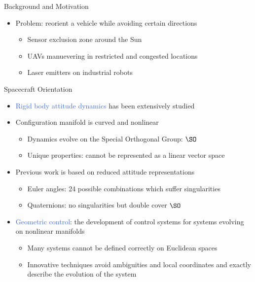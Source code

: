 \documentclass[final, usenames, dvipsnames]{beamer}
\newlength{\onecolwidth}
\def\Emph{\textcolor{RoyalBlue}}
\begin{document}
\begin{frame}[t]
\begin{columns}[T,onlytextwidth]
\begin{column}{\onecolwidth}
\begin{block}{Background and Motivation}
	\begin{itemize}
		\item Problem: reorient a vehicle while avoiding certain directions
		\begin{itemize}
			\item Sensor exclusion zone around the Sun
			\item UAVs manuevering in restricted and congested locations
			\item Laser emitters on industrial robots
		\end{itemize}
	\end{itemize}
\end{block} %

\begin{block}{Spacecraft Orientation}
	\begin{itemize}
		\item \Emph{Rigid body attitude dynamics} has been extensively studied
		\item Configuration manifold is curved and nonlinear
			\begin{itemize}
				\item Dynamics evolve on the Special Orthogonal Group: \( \SO \)
				\item Unique properties: cannot be represented as a linear vector space
			\end{itemize}
		\item Previous work is based on reduced attitude representations
			\begin{itemize}
				\item Euler angles: 24 possible combinations which suffer singularities
				\item Quaternions: no singularities but double cover \( \SO \)
			\end{itemize}
		\item \Emph{Geometric control}: the development of control systems for systems evolving on nonlinear manifolds
			\begin{itemize}
				\item Many systems cannot be defined correctly on Euclidean spaces
				\item Innovative techniques avoid ambiguities and local coordinates and exactly describe the evolution of the system
			\end{itemize}
		
	\end{itemize}
\end{block} 


\end{column}
\end{columns}
\end{frame}
\end{document}
